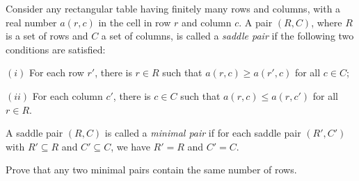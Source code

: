 Consider any rectangular table having finitely many rows and columns, with a real number $a(r,c)$ in the cell in row $r$ and column $c$. A pair $(R,C)$, where $R$ is a set of rows and $C$ a set of columns, is called a \emph{saddle pair} if the following two conditions are satisfied:

$(i)$ For each row $r'$, there is $r \in R$ such that $a(r,c) \geqslant a(r',c)$ for all $c \in C$;

$(ii)$ For each column $c'$, there is $c \in C$ such that $a(r,c) \leqslant a(r,c')$ for all $r \in R$.

A saddle pair $(R,C)$ is called a \emph{minimal pair} if for each saddle pair $(R',C')$ with $R' \subseteq R$ and $C' \subseteq C$, we have $R' = R$ and $C' = C$.

Prove that any two minimal pairs contain the same number of rows.
